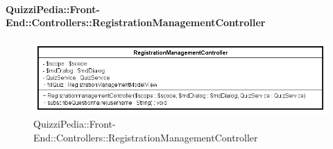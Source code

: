 \paragraph[QuizziPedia::Front-End::Controllers\\::RegistrationManagementController]{QuizziPedia::Front-End::Controllers::RegistrationManagementController}
\begin{figure} [ht]
	\centering
	\includegraphics[scale=0.80]{UML/Classi/Front-End/QuizziPedia_Front-end_Controller_RegistrationManagementController.png}
	\caption{QuizziPedia::Front-End::Controllers::RegistrationManagementController}
\end{figure} \FloatBarrier

